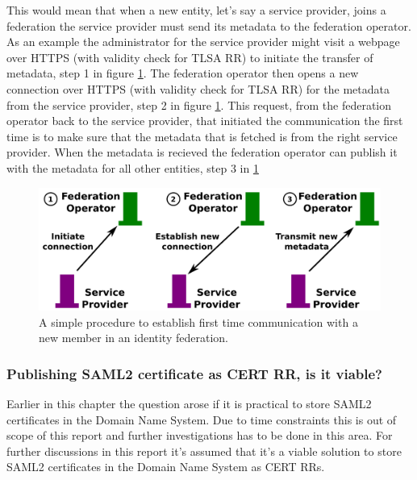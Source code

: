 This would mean that when a new entity, let's say a service provider, joins a federation the service provider must send its metadata to the federation operator.
As an example the administrator for the service provider might visit a webpage over HTTPS (with validity check for TLSA RR) to initiate the transfer of metadata, step 1 in figure \ref{ch4:onlyUseTLS}.
The federation operator then opens a new connection over HTTPS (with validity check for TLSA RR) for the metadata from the service provider, step 2 in figure \ref{ch4:onlyUseTLS}.
This request, from the federation operator back to the service provider, that initiated the communication the first time is to make sure that the metadata that is fetched is from the right service provider. 
When the metadata is recieved the federation operator can publish it with the metadata for all other entities, step 3 in \ref{ch4:onlyUseTLS}

\begin{figure}[ht]
\begin{center}
\includegraphics[scale=1]{Figures/onlyUseTLS.png}
\end{center}
\caption{A simple procedure to establish first time communication with a new member in an identity federation.
\label{ch4:onlyUseTLS}}
\end{figure}

%

\subsubsection{Publishing SAML2 certificate as CERT RR, is it viable?}
\label{subsec:saml2-certs-in-cert-rr}
Earlier in this chapter the question arose if it is practical to store SAML2 certificates in the Domain Name System.
Due to time constraints this is out of scope of this report and further investigations has to be done in this area.
For further discussions in this report it's assumed that it's a viable solution to store SAML2 certificates in the Domain Name System as CERT RRs.

